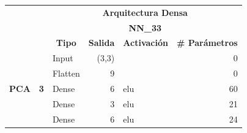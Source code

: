 \begin{table}[H]
\centering
\begin{center}
\begin{tabular}{ll|l|r|l|r|}
\cline{3-6}
                                                    &                             & \multicolumn{4}{c|}{\textbf{Arquitectura Densa}}                                                                                                           \\ \cline{3-6} 
                                                    &                             & \multicolumn{4}{c|}{\textbf{NN\_33}}                                                                                                                                   \\ \cline{3-6} 
                                                    &                             & \multicolumn{1}{c|}{\textbf{Tipo}} & \multicolumn{1}{c|}{\textbf{Salida}} & \multicolumn{1}{c|}{\textbf{Activaci\'{o}n}} & \multicolumn{1}{l|}{\textbf{\# Par\'{a}metros}} \\ \hline
\multicolumn{1}{|l|}{\multirow{7}{*}{\textbf{PCA}}} & \multirow{7}{*}{\textbf{3}} & Input                              & (3,3)                                &                                          & 0                                           \\ \cline{3-6} 
\multicolumn{1}{|l|}{}                              &                             & Flatten                            & 9                                    &                                          & 0                                           \\ \cline{3-6} 
\multicolumn{1}{|l|}{}                              &                             & Dense                              & 6                                    & elu                                     & 60                                          \\ \cline{3-6} 
\multicolumn{1}{|l|}{}                              &                             & Dense                              & 3                                    & elu                                     & 21                                          \\ \cline{3-6} 
\multicolumn{1}{|l|}{}                              &                             & Dense                              & 6                                    & elu                                     & 24                                          \\ \cline{3-6} 

\end{tabular}
\end{center}
\end{table}
